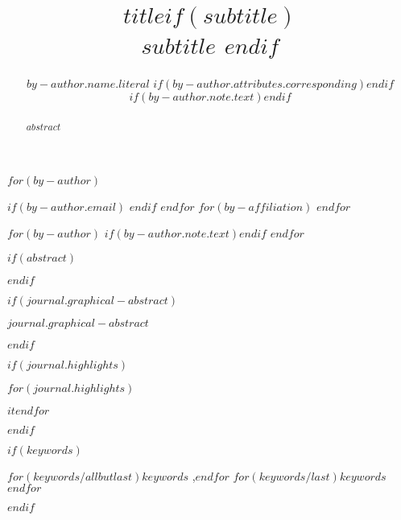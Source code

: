 
\begin{frontmatter}
\title{$title$$if(subtitle)$ \\\large{$subtitle$} $endif$}
$for(by-author)$\author[$for(by-author.affiliations)$$it.number$$sep$,$endfor$]{$by-author.name.literal$%
$if(by-author.attributes.corresponding)$$endif$%
$if(by-author.note.text)$$endif$}
$if(by-author.email)$  $endif$
$endfor$
$for(by-affiliation)$
$endfor$

$for(by-author)$
$if(by-author.note.text)$$endif$
$endfor$
        
$if(abstract)$
\begin{abstract}
$abstract$
\end{abstract}
$endif$

$if(journal.graphical-abstract)$\begin{graphicalabstract}
$journal.graphical-abstract$
\end{graphicalabstract}
$endif$

$if(journal.highlights)$\begin{highlights}
$for(journal.highlights)$\item $it$$endfor$
\end{highlights}
$endif$

$if(keywords)$
\begin{keyword}
    $for(keywords/allbutlast)$$keywords$ \sep $endfor$
    $for(keywords/last)$$keywords$$endfor$
\end{keyword}
$endif$
\end{frontmatter}
